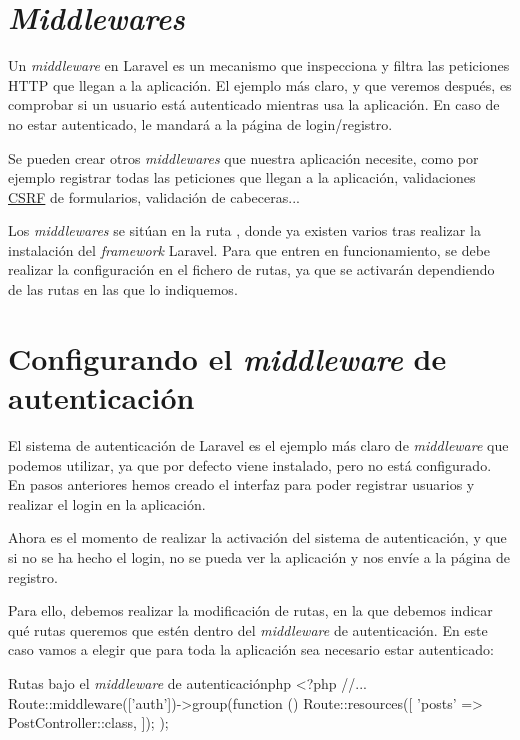 \chapter{\textit{Middlewares}}

Un \textit{middleware} en Laravel es un mecanismo que inspecciona y filtra las peticiones HTTP que llegan a la aplicación. El ejemplo más claro, y que veremos después, es comprobar si un usuario está autenticado mientras usa la aplicación. En caso de no estar autenticado, le mandará a la página de login/registro.

Se pueden crear otros \textit{middlewares} que nuestra aplicación necesite, como por ejemplo registrar todas las peticiones que llegan a la aplicación, validaciones \href{https://es.wikipedia.org/wiki/Cross-site_request_forgery}{CSRF} de formularios, validación de cabeceras...

Los \textit{middlewares} se sitúan en la ruta , donde ya existen varios tras realizar la instalación del \textit{framework} Laravel. Para que entren en funcionamiento, se debe realizar la configuración en el fichero de rutas, ya que se activarán dependiendo de las rutas en las que lo indiquemos.

\chapter{Configurando el \textit{middleware} de autenticación}

El sistema de autenticación de Laravel es el ejemplo más claro de \textit{middleware} que podemos utilizar, ya que por defecto viene instalado, pero no está configurado. En pasos anteriores hemos creado el interfaz para poder registrar usuarios y realizar el login en la aplicación.

Ahora es el momento de realizar la activación del sistema de autenticación, y que si no se ha hecho el login, no se pueda ver la aplicación y nos envíe a la página de registro.

Para ello, debemos realizar la modificación de rutas, en la que debemos indicar qué rutas queremos que estén dentro del \textit{middleware} de autenticación. En este caso vamos a elegir que para toda la aplicación sea necesario estar autenticado:


\begin{mycode}{Rutas bajo el \textit{middleware} de autenticación}{php}{}
<?php
//...
Route::middleware(['auth'])->group(function () {
    Route::resources([
    'posts' => PostController::class,
    ]);
});
\end{mycode}


